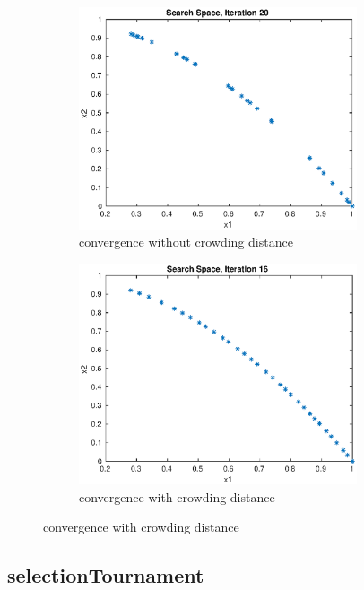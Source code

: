 \begin{figure}[h!]
	\centering
	\begin{subfigure}{.5\textwidth}
		\centering
		\includegraphics[width=0.9\textwidth]{images/noCrowding}
					\caption{convergence without crowding distance}
	\end{subfigure}%
	\begin{subfigure}{.5\textwidth}
		\centering
		\includegraphics[width=0.9\textwidth]{images/niceCrowding}
		\caption{convergence with crowding distance}
	\end{subfigure}
	\label{fig:crowdingDistance}
\end{figure}

\subsection{selectionTournament} \label{selectionTournament}

